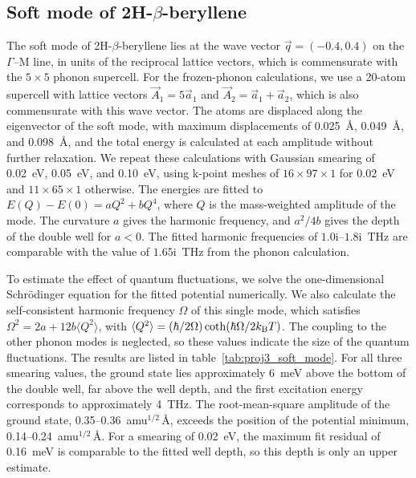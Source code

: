 \subsection*{Soft mode of 2H-$\beta$-beryllene}

The soft mode of 2H-$\beta$-beryllene lies at the wave vector $\vec{q}=(-0.4,0.4)$ on the $\Gamma$--$\mathrm{M}$ line,
in units of the reciprocal lattice vectors,
which is commensurate with the $5 \times 5$ phonon supercell.
For the frozen-phonon calculations,
we use a 20-atom supercell with lattice vectors $\vec{A}_{1}=5\vec{a}_{1}$ and $\vec{A}_{2}=\vec{a}_{1}+\vec{a}_{2}$,
which is also commensurate with this wave vector.
The atoms are displaced along the eigenvector of the soft mode,
with maximum displacements of \qty{0.025}{\angstrom}, \qty{0.049}{\angstrom}, and \qty{0.098}{\angstrom},
and the total energy is calculated at each amplitude without further relaxation.
We repeat these calculations with Gaussian smearing of \qty{0.02}{\electronvolt}, \qty{0.05}{\electronvolt}, and \qty{0.10}{\electronvolt},
using k-point meshes of $16 \times 97 \times 1$ for \qty{0.02}{\electronvolt} and $11 \times 65 \times 1$ otherwise.
The energies are fitted to $E(Q)-E(0)=aQ^{2}+bQ^{4}$,
where $Q$ is the mass-weighted amplitude of the mode.
The curvature $a$ gives the harmonic frequency,
and $a^{2}/4b$ gives the depth of the double well for $a<0$.
The fitted harmonic frequencies of $1.0\mathrm{i}$--$1.8\mathrm{i}$~\si{\tera\hertz} are comparable with the value of $1.65\mathrm{i}$~\si{\tera\hertz} from the phonon calculation.

To estimate the effect of quantum fluctuations,
we solve the one-dimensional Schr\"odinger equation for the fitted potential numerically.
We also calculate the self-consistent harmonic frequency $\Omega$ of this single mode,
which satisfies $\Omega^{2}=2a+12b\langle Q^{2}\rangle$,
with $\langle Q^{2}\rangle=(\hbar/2\Omega)\coth(\hbar\Omega/2k_\mathrm{B} T)$.
The coupling to the other phonon modes is neglected,
so these values indicate the size of the quantum fluctuations.
The results are listed in table~\ref{tab:proj3_soft_mode}.
For all three smearing values,
the ground state lies approximately \qty{6}{\milli\electronvolt} above the bottom of the double well,
far above the well depth,
and the first excitation energy corresponds to approximately \qty{4}{\tera\hertz}.
The root-mean-square amplitude of the ground state,
0.35--0.36~amu$^{1/2}$\,\AA,
exceeds the position of the potential minimum,
0.14--0.24~amu$^{1/2}$\,\AA.
For a smearing of \qty{0.02}{\electronvolt},
the maximum fit residual of \qty{0.16}{\milli\electronvolt} is comparable to the fitted well depth,
so this depth is only an upper estimate.

